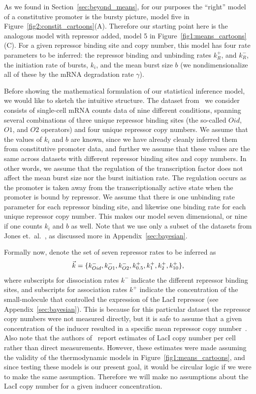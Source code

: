 As we found in Section~\ref{sec:beyond_means}, for our purposes the ``right''
model of a constitutive promoter is the bursty picture, model five in
Figure~\ref{fig2:constit_cartoons}(A). Therefore our starting point here is the
analogous model with repressor added, model 5 in
Figure~\ref{fig1:means_cartoons}(C). For a given repressor binding site and copy
number, this model has four rate parameters to be inferred: the repressor
binding and unbinding rates $k_R^+$, and $k_R^-$, the initiation rate of bursts,
$k_i$, and the mean burst size $b$ (we nondimensionalize all of these by the
mRNA degradation rate $\gamma$).

Before showing the mathematical formulation of our statistical inference model,
we would like to sketch the intuitive structure. The dataset
from~\cite{Jones2014} we consider consists of single-cell mRNA counts data of
nine different conditions, spanning several combinations of three unique
repressor binding sites (the so-called $Oid$, $O1$, and $O2$ operators) and four
unique repressor copy numbers. We assume that the values of $k_i$ and $b$ are
known, since we have already cleanly inferred them from constitutive promoter
data, and further we assume that these values are the same across datasets with
different repressor binding sites and copy numbers. In other words, we assume
that the regulation of the transcription factor does not affect the mean burst
size nor the burst initiation rate. The regulation occurs as the promoter is
taken away from the transcriptionally active state when the promoter is bound by
repressor. We assume that there is one unbinding rate parameter for each
repressor binding site, and likewise one binding rate for each unique repressor
copy number. This makes our model seven dimensional, or nine if one counts $k_i$
and $b$ as well. Note that we use only a subset of the datasets from Jones et.\
al.~\cite{Jones2014}, as discussed more in Appendix~\ref{sec:bayesian}.

Formally now, denote the set of seven repressor rates to be inferred as
\begin{equation}
\vec{k} =\{k_{Oid}^-, k_{O1}^-, k_{O2}^-,
k_{0.5}^+, k_{1}^+, k_{2}^+, k_{10}^+\},
\end{equation}
where subscripts for dissociation rates $k^-$  indicate the different repressor
binding sites, and subscripts for association rates $k^+$ indicate the
concentration of the small-molecule that controlled the expression of the LacI
repressor (see Appendix~\ref{sec:bayesian}). This is because for this particular
dataset the repressor copy numbers were not measured directly, but it is safe to
assume that a given concentration of the inducer resulted in a specific mean
repressor copy number~\cite{Chure2019a}. Also note that the authors
of~\cite{Jones2014} report estimates of LacI copy number per cell rather than
direct measurements. However, these estimates were made assuming the validity of
the thermodynamic models in Figure~\ref{fig1:means_cartoons}, and since testing
these models is our present goal, it would be circular logic if we were to make
the same assumption. Therefore we will make no assumptions about the LacI copy
number for a given inducer concentration.

